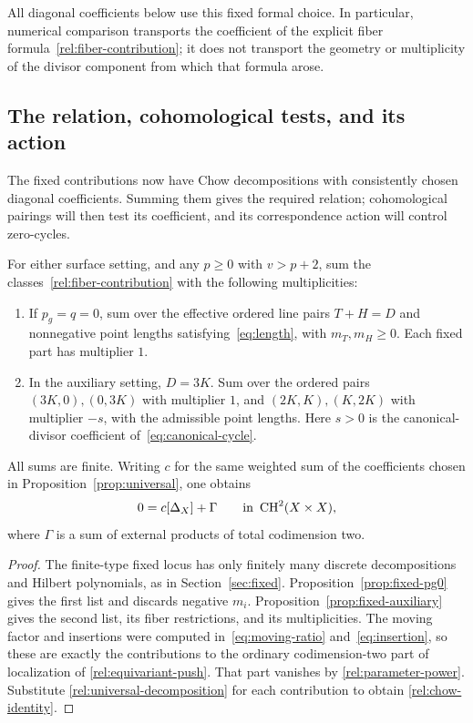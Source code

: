 All diagonal coefficients below use this fixed formal choice.
In particular, numerical comparison transports the coefficient of
the explicit fiber formula~\eqref{rel:fiber-contribution}; it does
not transport the geometry or multiplicity of the divisor component
from which that formula arose.

\subsection{The relation, cohomological tests, and its action}

The fixed contributions now have Chow decompositions with consistently
chosen diagonal coefficients. Summing them gives the required relation;
cohomological pairings will then test its coefficient, and its
correspondence action will control zero-cycles.

\begin{theorem}
\label{thm:chow-relation}
For either surface setting, and any $p\geq0$ with $v>p+2$, sum the
classes~\eqref{rel:fiber-contribution} with the following multiplicities:
\begin{enumerate}[label=\textup{(\roman*)}]
 \item If $p_g=q=0$, sum over the effective ordered line pairs $T+H=D$
 and nonnegative point lengths satisfying~\eqref{eq:length}, with
 $m_T,m_H\geq0$.  Each fixed part has multiplier $1$.
 \item In the auxiliary setting, $D=3K$.  Sum over the ordered pairs
 $(3K,0),(0,3K)$ with multiplier $1$, and $(2K,K),(K,2K)$ with
 multiplier $-s$, with the admissible point lengths.  Here $s>0$ is
 the canonical-divisor coefficient of~\eqref{eq:canonical-cycle}.
\end{enumerate}
All sums are finite.  Writing $c$ for the same weighted sum of the
coefficients chosen in Proposition~\ref{prop:universal}, one obtains
\begin{equation}
 0=c[\Delta_X]+\Gamma
 \qquad\text{in }\operatorname{CH}^2(X\times X),
 \label{rel:chow-identity}
\end{equation}
where $\Gamma$ is a sum of external products of total codimension two.
\end{theorem}

\begin{proof}
The finite-type fixed locus has only finitely many discrete
decompositions and Hilbert polynomials, as in Section~\ref{sec:fixed}.
Proposition~\ref{prop:fixed-pg0} gives the first list and discards
negative $m_i$.  Proposition~\ref{prop:fixed-auxiliary} gives the second
list, its fiber restrictions, and its multiplicities.  The moving
factor and insertions were computed in~\eqref{eq:moving-ratio}
and~\eqref{eq:insertion}, so these are exactly the contributions to the
ordinary codimension-two part of localization of
\eqref{rel:equivariant-push}.  That part vanishes by
\eqref{rel:parameter-power}.  Substitute
\eqref{rel:universal-decomposition} for each contribution to obtain
\eqref{rel:chow-identity}.
\end{proof}

